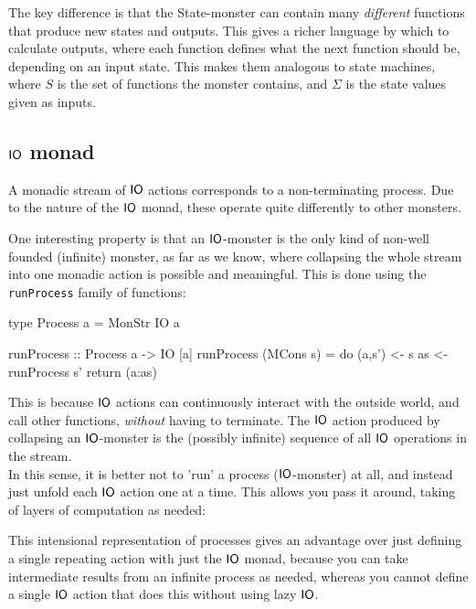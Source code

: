 The key difference is that the State-monster can contain many \emph{different} functions that produce new states and outputs. This gives a richer language by which to calculate outputs, where each function defines what the next function should be, depending on an input state. This makes them analogous to state machines, where $S$ is the set of functions the monster contains, and $\Sigma$ is the state values given as inputs.

\subsection{$\mathsf{IO}$ monad}

A monadic stream of $\mathsf{IO}$ actions corresponds to a non-terminating process. Due to the nature of the $\mathsf{IO}$ monad, these operate quite differently to other monsters.

One interesting property is that an $\mathsf{IO}$-monster is the only kind of non-well founded (infinite) monster, as far as we know, where collapsing the whole stream into one monadic action is possible and meaningful. This is done using the \verb+runProcess+ family of functions:

\begin{haskell}
type Process a = MonStr IO a

runProcess :: Process a -> IO [a]
runProcess (MCons s) = do (a,s') <- s
                          as     <- runProcess s'
                          return (a:as)
\end{haskell}

This is because $\mathsf{IO}$ actions can continuously interact with the outside world, and call other functions, \emph{without} having to terminate. The $\mathsf{IO}$ action produced by collapsing an $\mathsf{IO}$-monster is the (possibly infinite) sequence of all $\mathsf{IO}$ operations in the stream. \\

In this sense, it is better not to 'run' a process ($\mathsf{IO}$-monster) at all, and instead just unfold each $\mathsf{IO}$ action one at a time. This allows you pass it around, taking of layers of computation as needed:

This intensional representation of processes gives an advantage over just defining a single repeating action with just the $\mathsf{IO}$ monad, because you can take intermediate results from an infinite process as needed, whereas you cannot define a single $\mathsf{IO}$ action that does this without using lazy $\mathsf{IO}$.

